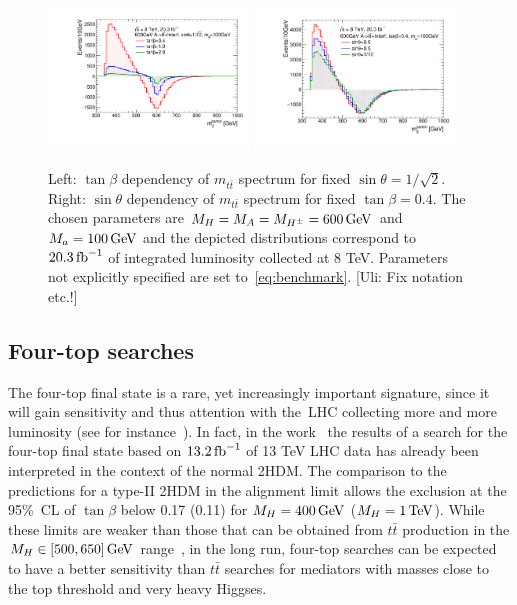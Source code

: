 \begin{figure}
\centering
\includegraphics[width=0.475\textwidth]{texinputs/04_grid/figures/ttres/ttres_2HDMa_A_tanb.pdf} \quad 
\includegraphics[width=0.475\textwidth]{texinputs/04_grid/figures/ttres/ttres_2HDMa_A_sinp.pdf}
\vspace{4mm}
\caption{Left: $\tan \beta$ dependency of $m_{t \bar t}$ spectrum for fixed $\sin \theta = 1/\sqrt{2}$. Right:  $\sin \theta$ dependency of $m_{t \bar t}$ spectrum for fixed $\tan \beta = 0.4$. The chosen \hdma parameters are $M_{H}=M_{A}=M_{H^{\pm}} =600 \, {\rm GeV}$ and $M_{a}=100 \, {\rm GeV}$ and the depicted distributions correspond to $20.3 \, {\rm fb}^{-1}$ of integrated luminosity collected at 8 TeV. Parameters not explicitly specified are set to~\eqref{eq:benchmark}. {\color{red} [Uli: Fix notation etc.!]}}
\label{fig:ttres_2HDM_A}
\end{figure}

\subsection{Four-top searches}

The four-top final state is a rare, yet increasingly important signature, since it  will gain sensitivity and thus attention with the~LHC collecting more and more luminosity (see for instance~\cite{ATLAS-CONF-2016-104,Sirunyan:2017roi,Aaboud:2018xuw,Hajer:2015gka,Gori:2016zto,Alvarez:2016nrz}).  In fact, in the work~\cite{ATLAS-CONF-2016-104} the results of a search for the four-top final state based on $13.2 \, {\rm fb}^{-1}$ of 13 TeV LHC data has already been interpreted in the context of the normal 2HDM. The comparison to the predictions for a type-II 2HDM in the alignment limit allows the exclusion at the 95\%~CL of $\tan \beta$  below 0.17 (0.11) for $M_{H} = 400 \, {\rm GeV}$ ($M_{H} = 1 \, {\rm TeV}$). While these limits are weaker than those that can be obtained from $t \bar t$ production in the $M_{H} \in [500, 650] \, {\rm GeV}$ range~\cite{Aaboud:2017hnm}, in the long run, four-top searches can be expected to have a better sensitivity than $t \bar t$ searches for mediators with masses close to the top threshold and very heavy Higgses.

